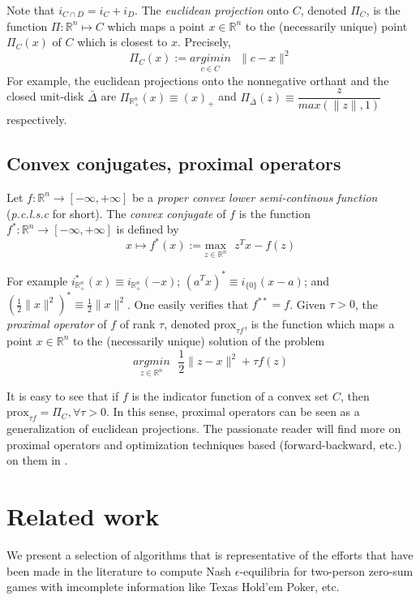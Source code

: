 \documentclass[12pt]{article}
\begin{document}
Note that $i_{C \cap D} = i_C + i_D$. The \textit{euclidean projection} onto $C$, denoted $\Pi_C$, is the function
$\Pi: \mathbb{R}^n \mapsto C$ which maps a point $x \in \mathbb{R}^n$ to the (necessarily unique) point $\Pi_C(x)$ of $C$ which is closest to $x$. Precisely,
\begin{equation}
  \Pi_C(x) := \underset{c \in C}{argimin}\text{ }\|c - x\|^2
\end{equation}
For example, the euclidean projections onto the nonnegative orthant and the closed unit-disk $\bar{\Delta}$
are $\Pi_{\mathbb{R}^n_+}(x) \equiv (x)_+$ and $\Pi_{\bar{\Delta}}(z) \equiv \dfrac{z}{max(\|z\|, 1)}$ respectively.

\subsection{Convex conjugates, proximal operators}
Let $f : \mathbb{R}^n \rightarrow [-\infty, +\infty]$ be a \textit{proper convex lower semi-continous function}
(\textit{p.c.l.s.c} for short). The \textit{convex conjugate} of $f$ is the function $f^*: \mathbb{R}^n \rightarrow [-\infty, +\infty]$ is defined by
\begin{equation}
  x \mapsto f^*(x) := \underset{z \in \mathbb{R}^n}{\text{max}}\text{ }z^Tx - f(z)
\end{equation}

For example $i_{\mathbb{R}^{n}_+}^*(x) \equiv i_{\mathbb{R}^{n}_+}(-x)$; $(a^Tx)^* \equiv i_{\{0\}}(x - a)$; and $(\frac{1}{2}\|x\|^2)^* \equiv \frac{1}{2}\|x\|^2$. One easily verifies that $f^{**} = f$. Given $\tau > 0$, the \textit{proximal operator} of $f$ of rank
$\tau$, denoted $\text{prox}_{\tau f}$, is the function which maps a point $x \in \mathbb{R}^n$ to the (necessarily
unique) solution of the problem
\begin{equation}
  \underset{z \in \mathbb{R}^n}{argmin}\text{ }\frac{1}{2}\|z - x\|^2 + \tau f(z)
\end{equation}

It is easy to see that if $f$ is the indicator function of a convex set $C$, then $\text{prox}_{\tau f} = \Pi_C, \forall \tau > 0$. In this sense, proximal operators can be seen
as a generalization of euclidean projections. The passionate reader will find more on proximal operators and optimization techniques based (forward-backward, etc.) on them in \cite{combettes2011proximal}. 


\section{Related work}
\label{sec:related_work}
We present a selection of algorithms that is representative of the efforts that have been made in the literature to compute Nash $\epsilon$-equilibria for two-person zero-sum games with imcomplete information like Texas Hold'em Poker, etc.
\end{document}
